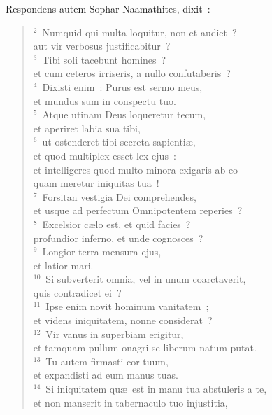 \lettrine[lines=3,image=true,loversize=0.05,lraise=-0.03]{R}{}espondens autem Sophar Naamathites, dixit~:
\begin{flushleft}\begin{verse}\vspace{6pt}${}^{2}$~Numquid qui multa loquitur, non et audiet~?\\ aut vir verbosus justificabitur~?\\
${}^{3}$~Tibi soli tacebunt homines~?\\ et cum ceteros irriseris, a nullo confutaberis~?\\
${}^{4}$~Dixisti enim~: Purus est sermo meus,\\ et mundus sum in conspectu tuo.\\
${}^{5}$~Atque utinam Deus loqueretur tecum,\\ et aperiret labia sua tibi,\\
${}^{6}$~ut ostenderet tibi secreta sapienti\ae ,\\ et quod multiplex esset lex ejus~:\\ et intelligeres quod multo minora exigaris ab eo\\ quam meretur iniquitas tua~!\\
${}^{7}$~Forsitan vestigia Dei comprehendes,\\ et usque ad perfectum Omnipotentem reperies~?\\
${}^{8}$~Excelsior c\ae lo est, et quid facies~?\\ profundior inferno, et unde cognosces~?\\
${}^{9}$~Longior terra mensura ejus,\\ et latior mari.\\
${}^{10}$~Si subverterit omnia, vel in unum coarctaverit,\\ quis contradicet ei~?\\
${}^{11}$~Ipse enim novit hominum vanitatem~;\\ et videns iniquitatem, nonne considerat~?\\
${}^{12}$~Vir vanus in superbiam erigitur,\\ et tamquam pullum onagri se liberum natum putat.\\
${}^{13}$~Tu autem firmasti cor tuum,\\ et expandisti ad eum manus tuas.\\
${}^{14}$~Si iniquitatem qu\ae\ est in manu tua abstuleris a te,\\ et non manserit in tabernaculo tuo injustitia,\\

\end{verse}
\end{flushleft}
